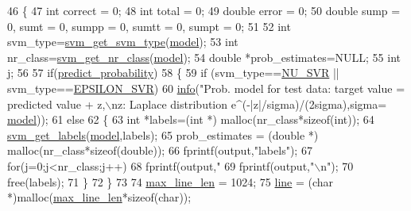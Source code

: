 \begin{DoxyCode}
46 \{
47     \textcolor{keywordtype}{int} correct = 0;
48     \textcolor{keywordtype}{int} total = 0;
49     \textcolor{keywordtype}{double} error = 0;
50     \textcolor{keywordtype}{double} sump = 0, sumt = 0, sumpp = 0, sumtt = 0, sumpt = 0;
51 
52     \textcolor{keywordtype}{int} svm\_type=\hyperlink{svm_8h_add0a326d36e24044cf958a420d6f4e19}{svm\_get\_svm\_type}(\hyperlink{svm-predict_8c_a50c87b127b14787341e9630f4f5c700a}{model});
53     \textcolor{keywordtype}{int} nr\_class=\hyperlink{svm_8h_a73c7339cbc8a38eb9f1e8ad6fbe11ae8}{svm\_get\_nr\_class}(\hyperlink{svm-predict_8c_a50c87b127b14787341e9630f4f5c700a}{model});
54     \textcolor{keywordtype}{double} *prob\_estimates=NULL;
55     \textcolor{keywordtype}{int} j;
56 
57     \textcolor{keywordflow}{if}(\hyperlink{svm-predict_8c_a1501132f5226b295e5300d74da55a2b9}{predict\_probability})
58     \{
59         \textcolor{keywordflow}{if} (svm\_type==\hyperlink{svm_8h_a06fc87d81c62e9abb8790b6e5713c55ba9e113c85baa91dc44fe128028e384309}{NU\_SVR} || svm\_type==\hyperlink{svm_8h_a06fc87d81c62e9abb8790b6e5713c55bae8edabc208c6076619bdfb064b68815a}{EPSILON\_SVR})
60             \hyperlink{svm-predict_8c_ab42d5f876cd10cdae152b4acbf2e7b8b}{info}(\textcolor{stringliteral}{"Prob. model for test data: target value = predicted value + z,\(\backslash\)nz: Laplace
       distribution e^(-|z|/sigma)/(2sigma),sigma=%
      \hyperlink{svm-predict_8c_a50c87b127b14787341e9630f4f5c700a}{model}));
61         \textcolor{keywordflow}{else}
62         \{
63             \textcolor{keywordtype}{int} *labels=(\textcolor{keywordtype}{int} *) malloc(nr\_class*\textcolor{keyword}{sizeof}(\textcolor{keywordtype}{int}));
64             \hyperlink{svm_8h_a1eafdf09b884847a04a72cf22ddb95f2}{svm\_get\_labels}(\hyperlink{svm-predict_8c_a50c87b127b14787341e9630f4f5c700a}{model},labels);
65             prob\_estimates = (\textcolor{keywordtype}{double} *) malloc(nr\_class*\textcolor{keyword}{sizeof}(\textcolor{keywordtype}{double}));
66             fprintf(output,\textcolor{stringliteral}{"labels"});
67             \textcolor{keywordflow}{for}(j=0;j<nr\_class;j++)
68                 fprintf(output,\textcolor{stringliteral}{" %
69             fprintf(output,\textcolor{stringliteral}{"\(\backslash\)n"});
70             free(labels);
71         \}
72     \}
73 
74     \hyperlink{svm-predict_8c_acad24c15bee67d2026f56bc94a1188c7}{max\_line\_len} = 1024;
75     \hyperlink{svm-predict_8c_a8adb30f4f6669f927fd9232f686c637b}{line} = (\textcolor{keywordtype}{char} *)malloc(\hyperlink{svm-predict_8c_acad24c15bee67d2026f56bc94a1188c7}{max\_line\_len}*\textcolor{keyword}{sizeof}(\textcolor{keywordtype}{char}));
}}
\end{DoxyCode}
